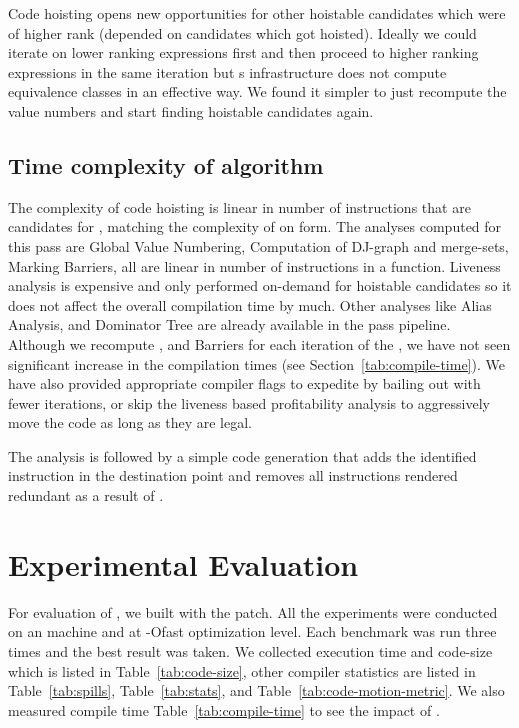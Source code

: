 \documentclass[acmlarge,review,anonymous]{acmart}\settopmatter{printfolios=true}
\begin{document}
Code hoisting opens new opportunities for other hoistable candidates which were
of higher rank (depended on candidates which got hoisted). Ideally we could
iterate on lower ranking expressions first and then proceed to higher ranking
expressions in the same iteration but s \GVN{} infrastructure does not
compute equivalence classes in an effective way. We found it simpler to just
recompute the value numbers and start finding hoistable candidates again.

\subsection{Time complexity of algorithm}
The complexity of code hoisting is linear in number of instructions that are
candidates for \gcm{}, matching the complexity of \PRE{} on \SSA{} form.
The analyses computed for this pass are Global Value Numbering, Computation of
DJ-graph and merge-sets, Marking Barriers, all are linear in number of
instructions in a function. Liveness analysis is expensive and only performed
on-demand for hoistable candidates so it does not affect the overall compilation
time by much. Other analyses like Alias Analysis, \MemorySSA{} and Dominator Tree
are already available in the \LLVM{} pass pipeline. Although we recompute \GVN{}, and
Barriers for each iteration of the \gcm{}, we have not seen significant
increase in the compilation times (see Section~\ref{tab:compile-time}). We have also
provided appropriate compiler
flags to expedite \gcm{} by bailing out with fewer iterations, or skip the
liveness based profitability analysis to aggressively move the code as long as
they are legal.

The analysis is followed by a simple code generation that adds the identified
instruction in the destination point and removes all instructions rendered
redundant as a result of \gcm{}.


\section{Experimental Evaluation}
\label{sec:experimental-results}
For evaluation of \gcm{}, we built \SPEC{} with the patch. All the experiments
were conducted on an \xlinux{} machine and at -Ofast optimization level. Each
benchmark was run three times and the best result was taken. We collected
execution time and code-size which is listed in Table~\ref{tab:code-size}, other
compiler statistics are listed in Table~\ref{tab:spills}, Table~\ref{tab:stats}, and
Table~\ref{tab:code-motion-metric}.  We also measured compile time
Table~\ref{tab:compile-time} to see the impact of \gcm{}.
\end{document}
